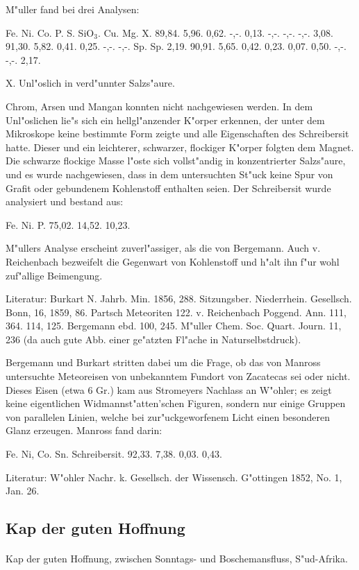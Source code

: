 \documentclass[a4paper, 11pt, oneside]{article}
\begin{document}
M"uller fand bei drei Analysen:

Fe. Ni. Co. P. S. SiO$_{3}$. Cu. Mg. X.  
89,84. 5,96. 0,62. -,-. 0,13. -,-. -,-. -,-. 3,08.  
91,30. 5,82. 0,41. 0,25. -,-. -,-. Sp. Sp. 2,19.  
90,91. 5,65. 0,42. 0,23. 0,07. 0,50. -,-. -,-. 2,17.

X. Unl"oslich in verd"unnter Salzs"aure.

Chrom, Arsen und Mangan konnten nicht nachgewiesen werden. In dem Unl"oslichen lie"s sich ein hellgl"anzender K"orper erkennen, der unter dem Mikroskope keine bestimmte Form zeigte und alle Eigenschaften des Schreibersit hatte. Dieser und ein leichterer, schwarzer, flockiger K"orper folgten dem Magnet. Die schwarze flockige Masse l"oste sich vollst"andig in konzentrierter Salzs"aure, und es wurde nachgewiesen, dass in dem untersuchten St"uck keine Spur von Grafit oder gebundenem Kohlenstoff enthalten seien. Der Schreibersit wurde analysiert und bestand aus:

Fe. Ni. P.  
75,02. 14,52. 10,23.

M"ullers Analyse erscheint zuverl"assiger, als die von Bergemann. Auch v. Reichenbach bezweifelt die Gegenwart von Kohlenstoff und h"alt ihn f"ur wohl zuf"allige Beimengung.

Literatur: Burkart N. Jahrb. Min. 1856, 288. Sitzungsber. Niederrhein. Gesellsch. Bonn, 16, 1859, 86. Partsch Meteoriten 122. v. Reichenbach Poggend. Ann. 111, 364. 114, 125. Bergemann ebd. 100, 245. M"uller Chem. Soc. Quart. Journ. 11, 236 (da auch gute Abb. einer ge"atzten Fl"ache in Naturselbstdruck).

Bergemann und Burkart stritten dabei um die Frage, ob das von Manross untersuchte Meteoreisen von unbekanntem Fundort von Zacatecas sei oder nicht. Dieses Eisen (etwa 6 Gr.) kam aus Stromeyers Nachlass an W"ohler; es zeigt keine eigentlichen Widmannst"atten'schen Figuren, sondern nur einige Gruppen von parallelen Linien, welche bei zur"uckgeworfenem Licht einen besonderen Glanz erzeugen. Manross fand darin:

Fe. Ni, Co. Sn. Schreibersit.  
92,33. 7,38. 0,03. 0,43.

Literatur: W"ohler Nachr. k. Gesellsch. der Wissensch. G"ottingen 1852, No. 1, Jan. 26.

\subsection{Kap der guten Hoffnung}
\normalsize
\paragraph{}
Kap der guten Hoffnung, zwischen Sonntags- und Boschemansfluss, S"ud-Afrika.
\end{document}
